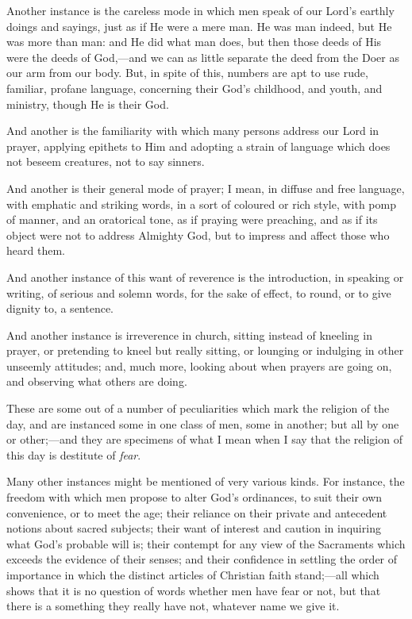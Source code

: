 Another instance is the careless mode in which men speak of our
Lord's earthly doings and sayings, just as if He were a mere man. He
was man indeed, but He was more than man: and He did what man does,
but then those deeds of His were the deeds of God,—and we can as
little separate the deed from the Doer as our arm from our body. But,
in spite of this, numbers are apt to use rude, familiar, profane
language, concerning their God's childhood, and youth, and ministry,
though He is their God.

And another is the familiarity with which many persons address our
Lord in prayer, applying epithets to Him and adopting a strain of
language which does not beseem creatures, not to say sinners.

And another is their general mode of prayer; I mean, in diffuse and
free language, with emphatic and striking words, in a sort of coloured
or rich style, with pomp of manner, and an oratorical tone, as if
praying were preaching, and as if its object were not to address
Almighty God, but to impress and affect those who heard them.

And another instance of this want of reverence is the introduction,
in speaking or writing, of serious and solemn words, for the sake of
effect, to round, or to give dignity to, a sentence.

And another instance is irreverence in church, sitting instead of
kneeling in prayer, or pretending to kneel but really sitting, or
lounging or indulging in other unseemly attitudes; and, much more,
looking about when prayers are going on, and observing what others are
doing.

These are some out of a number of peculiarities which mark the
religion of the day, and are instanced some in one class of men, some
in another; but all by one or other;—and they are specimens of what
I mean when I say that the religion of this day is destitute of \emph{fear}.

Many other instances might be mentioned of very various kinds. For
instance, the freedom with which men propose to alter God's
ordinances, to suit their own convenience, or to meet the age; their
reliance on their private and antecedent notions about sacred
subjects; their want of interest and caution in inquiring what God's
probable will is; their contempt for any view of the Sacraments which
exceeds the evidence of their senses; and their confidence in settling
the order of importance in which the distinct articles of Christian
faith stand;—all which shows that it is no question of words whether
men have fear or not, but that there is a something they really have
not, whatever name we give it.

